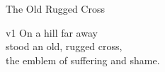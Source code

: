 \begin{song}{The Old Rugged Cross}
    \begin{songframe}{v1}
        On a hill far away \\
        stood an old, rugged cross, \\
        the emblem of suffering and shame.
    \end{songframe}

    \creator{}
\end{song}
\endinput

